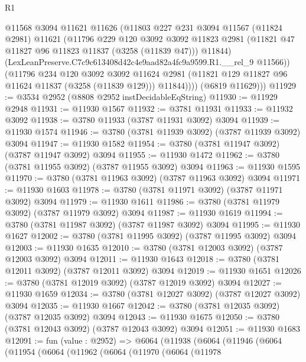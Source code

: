 \begin{lexlean}{R1}
\begin{coremodule}
              @11568
              @3094
              @11621
              @11626
              (@11803
                @227
                @231
                @3094
                @11567
                (@11824 @2981)
                @11621
                (@11796
                  @229
                  @120
                  @3092
                  @3092
                  @11823
                  @2981
                  (@11821 @47 @11827 @96 @11823 @11837 (@3258 (@11839 @47)))
                  @11844)
                (LexLeanPreserve.C7c9c613408d42c4e9aad82a4fc9a9599.R1.__rel_9 @11566))
              (@11796
                @234
                @120
                @3092
                @3092
                @11624
                @2981
                (@11821 @129 @11827 @96 @11624 @11837 (@3258 (@11839 @129)))
                @11844))))
        (@6819 @11629)))
@11929 := @3534 @2952 (@8808 @2952 instDecidableEqString)
@11930 := @11929 @2948
@11931 := @11930 @1567
@11932 := @3781 @11931
@11933 := @11932 @3092
@11938 := @3780 @11933 (@3787 @11931 @3092) @3094
@11939 := @11930 @1574
@11946 := @3780 (@3781 @11939 @3092) (@3787 @11939 @3092) @3094
@11947 := @11930 @1582
@11954 := @3780 (@3781 @11947 @3092) (@3787 @11947 @3092) @3094
@11955 := @11930 @1472
@11962 := @3780 (@3781 @11955 @3092) (@3787 @11955 @3092) @3094
@11963 := @11930 @1595
@11970 := @3780 (@3781 @11963 @3092) (@3787 @11963 @3092) @3094
@11971 := @11930 @1603
@11978 := @3780 (@3781 @11971 @3092) (@3787 @11971 @3092) @3094
@11979 := @11930 @1611
@11986 := @3780 (@3781 @11979 @3092) (@3787 @11979 @3092) @3094
@11987 := @11930 @1619
@11994 := @3780 (@3781 @11987 @3092) (@3787 @11987 @3092) @3094
@11995 := @11930 @1627
@12002 := @3780 (@3781 @11995 @3092) (@3787 @11995 @3092) @3094
@12003 := @11930 @1635
@12010 := @3780 (@3781 @12003 @3092) (@3787 @12003 @3092) @3094
@12011 := @11930 @1643
@12018 := @3780 (@3781 @12011 @3092) (@3787 @12011 @3092) @3094
@12019 := @11930 @1651
@12026 := @3780 (@3781 @12019 @3092) (@3787 @12019 @3092) @3094
@12027 := @11930 @1659
@12034 := @3780 (@3781 @12027 @3092) (@3787 @12027 @3092) @3094
@12035 := @11930 @1667
@12042 := @3780 (@3781 @12035 @3092) (@3787 @12035 @3092) @3094
@12043 := @11930 @1675
@12050 := @3780 (@3781 @12043 @3092) (@3787 @12043 @3092) @3094
@12051 := @11930 @1683
@12091 := fun (value : @2952) =>
  @6064
    (@11938
      (@6064
        (@11946
          (@6064
            (@11954
              (@6064
                (@11962
                  (@6064
                    (@11970
                      (@6064
                        (@11978

\end{coremodule}
\end{lexlean}
